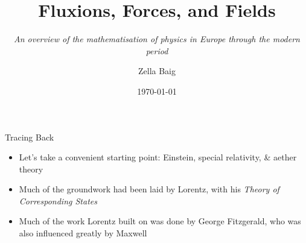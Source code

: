 \documentclass{beamer}
\title{Fluxions, Forces, and Fields}
\subtitle{\small \emph{An overview of the mathematisation of physics in Europe through the modern period}}
\date{\today}
\author{Zella Baig}
\begin{document}
\maketitle
  \begin{frame}{Tracing Back}
	\begin{itemize}
		\item Let's take a convenient starting point: Einstein, special relativity, \& aether theory
		\item Much of the groundwork had been laid by Lorentz, with his \emph{Theory of Corresponding States}{\autocite{specrel}}
	\item Much of the work Lorentz built on was done by George Fitzgerald, who was also influenced greatly by Maxwell
	\end{itemize}
  \end{frame}
\end{document}
